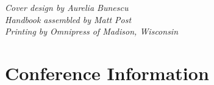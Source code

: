 \documentclass[twoside,makeidx]{book}
\begin{document}


\fancyfoot[C]{}





\cleardoublepage
\thispagestyle{empty}
\vspace*{6in}
\noindent\emph{Cover design by Aurelia Bunescu}\\
\noindent\emph{Handbook assembled by Matt Post}\\
\emph{Printing by Omnipress of Madison, Wisconsin}

\newpage
\cleardoublepage
\fancyfoot[C]{\thepage}
\frontmatter





\setcounter{tocdepth}{2}
\tableofcontents
\mainmatter
\pagestyle{fancy}


\clearpage
\setheaders{}{}



\chapter{Conference Information}


\clearpage

\clearpage


\clearpage%
\setheaders{}{}


%
\clearpage%
\setheaders{}{}
\end{document}
